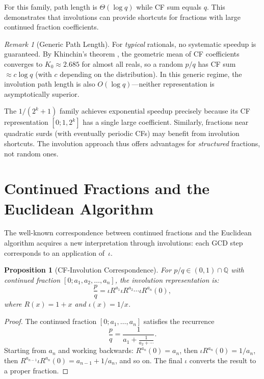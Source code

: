 \documentclass[11pt]{article}
\theoremstyle{plain}
\newtheorem{proposition}[theorem]{Proposition}
\theoremstyle{definition}
\theoremstyle{remark}
\newtheorem{remark}[theorem]{Remark}
\begin{document}
For this family, path length is $\Theta(\log q)$ while CF sum equals $q$.
This demonstrates that involutions can provide shortcuts for fractions with
large continued fraction coefficients.

\begin{remark}[Generic Path Length]
For \emph{typical} rationals, no systematic speedup is guaranteed. By Khinchin's
theorem \cite{Khinchin1964}, the geometric mean of CF coefficients converges to
$K_0 \approx 2.685$ for almost all reals, so a random $p/q$ has CF sum $\approx c \log q$
(with $c$ depending on the distribution). In this generic regime, the involution path
length is also $O(\log q)$---neither representation is asymptotically superior.

The $1/(2^k+1)$ family achieves exponential speedup precisely because its CF representation
$[0; 1, 2^k]$ has a single large coefficient. Similarly, fractions near quadratic surds
(with eventually periodic CFs) may benefit from involution shortcuts. The involution
approach thus offers advantages for \emph{structured} fractions, not random ones.
\end{remark}

\section{Continued Fractions and the Euclidean Algorithm}

The well-known correspondence between continued fractions and the Euclidean
algorithm acquires a new interpretation through involutions: each GCD step
corresponds to an application of~$\iota$.

\begin{proposition}[CF-Involution Correspondence]
For $p/q \in (0,1) \cap \mathbb{Q}$ with continued fraction $[0; a_1, a_2, \ldots, a_n]$,
the involution representation is:
\[
\frac{p}{q} = \iota R^{a_1} \iota R^{a_2} \cdots \iota R^{a_n}(0),
\]
where $R(x) = 1+x$ and $\iota(x) = 1/x$.
\end{proposition}

\begin{proof}
The continued fraction $[0; a_1, \ldots, a_n]$ satisfies the recurrence
\[
\frac{p}{q} = \frac{1}{a_1 + \frac{1}{a_2 + \cdots}}.
\]
Starting from $a_n$ and working backwards: $R^{a_n}(0) = a_n$,
then $\iota R^{a_n}(0) = 1/a_n$, then $R^{a_{n-1}} \iota R^{a_n}(0) = a_{n-1} + 1/a_n$,
and so on. The final $\iota$ converts the result to a proper fraction.
\end{proof}
\end{document}
